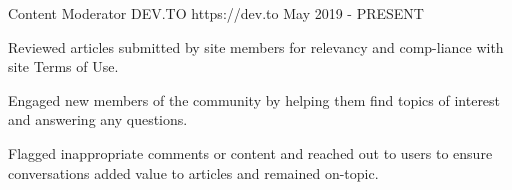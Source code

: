 

\begin{cventries}

  \cventry
    {Content Moderator} %
    {DEV.TO} %
    {https://dev.to} %
    {May 2019 - PRESENT} %
    {
      \begin{cvitems} %
        \item {Reviewed articles submitted by site members for relevancy and comp-liance with site Terms of Use.}
        \item {Engaged new members of the community by helping them find topics of interest and answering any questions.}
        \item {Flagged inappropriate comments or content and reached out to users to ensure conversations added value to articles and remained on-topic.}
      \end{cvitems}
    }

\end{cventries}
